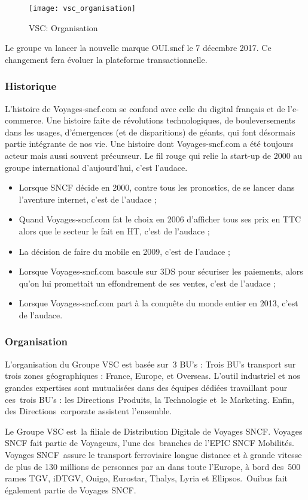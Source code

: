 \begin{figure}[ht]
 \centering
 \texttt{[image: vsc\_organisation]}
 \caption{VSC: Organisation}
\end{figure}

Le groupe va lancer la nouvelle marque OUI.sncf le 7 décembre 2017.
Ce changement fera évoluer la plateforme transactionnelle.

\subsubsection{Historique}
L'histoire de Voyages-sncf.com se confond avec celle du digital français et de l'e-commerce.
Une histoire faite de révolutions technologiques, de bouleversements dans les usages, d'émergences (et de disparitions) de géants,
qui font désormais partie intégrante de nos vie. Une histoire dont Voyages-sncf.com a été toujours acteur mais aussi souvent précurseur.
Le fil rouge qui relie la start-up de 2000 au groupe international d'aujourd'hui, c'est l'audace.
\begin{itemize}
 \item Lorsque SNCF décide en 2000, contre tous les pronostics, de se lancer dans l'aventure internet, c'est de l'audace ;
 \item Quand Voyages-sncf.com fat le choix en 2006 d'afficher tous ses prix en TTC alors que le secteur le fait en HT, c'est de l'audace ;
 \item La décision de faire du mobile en 2009, c'est de l'audace ;
 \item Lorsque Voyages-sncf.com bascule sur 3DS pour sécuriser les paiements, alors qu'on lui promettait un effondrement de ses ventes, c'est de l'audace ;
 \item Lorsque Voyages-sncf.com part à la conquête du monde entier en 2013, c'est de l'audace.
\end{itemize}

\subsubsection{Organisation}
L'organisation du Groupe VSC est basée sur 3 BU’s :
Trois BU’s transport sur trois zones géographiques : France, Europe, et Overseas.
L’outil industriel et nos grandes expertises sont mutualisées dans des équipes dédiées travaillant pour ces trois BU’s : les Directions Produits, la Technologie et le Marketing. Enfin, des Directions corporate assistent l'ensemble.

Le Groupe VSC est la filiale de Distribution Digitale de Voyages SNCF.
Voyages SNCF fait partie de Voyageurs, l'une des branches de l'EPIC SNCF Mobilités. 
Voyages SNCF assure le transport ferroviaire longue distance et à grande vitesse de plus de 130 millions de personnes par an dans toute l’Europe, à bord des 500  rames TGV, iDTGV, Ouigo, Eurostar, Thalys, Lyria et Ellipsos. Ouibus fait également partie de Voyages SNCF.

